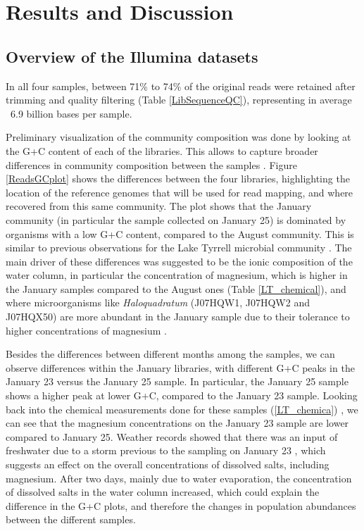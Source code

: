 \clearpage
\section{Results and Discussion}

\subsection{Overview of the Illumina datasets}

In all four samples, between 71\% to 74\% of the original reads were retained after trimming and quality filtering (Table \ref{LibSequenceQC}), representing in average ~6.9 billion bases per sample.

Preliminary visualization of the community composition was done by looking at the G+C content of each of the libraries. This allows to capture broader differences in community composition between the samples \cite{Podell:2013kx,Ghai:2012fb,Podell:2013fp}. Figure \ref{ReadsGCplot} shows the differences between the four libraries, highlighting the location of the reference genomes that will be used for read mapping, and where recovered from this same community. The plot shows that the January community (in particular the sample collected on January 25) is dominated by organisms with a low G+C content, compared to the August community. This is similar to previous observations for the Lake Tyrrell microbial community \cite{Podell:2013fp}. The main driver of these differences was suggested to be the ionic composition of the water column, in particular the concentration of magnesium, which is higher in the January samples compared to the August ones (Table \ref{LT_chemical}), and where microorganisms like \textit{Haloquadratum} (J07HQW1, J07HQW2 and J07HQX50) are more abundant in the January sample due to their tolerance to higher concentrations of magnesium \cite{Podell:2013fp}. 

Besides the differences between different months among the samples, we can observe differences within the January libraries, with different G+C peaks in the January 23 versus the January 25 sample. In particular, the January 25 sample shows a higher peak at lower G+C, compared to the January 23 sample. Looking back into the chemical measurements done for these samples (\ref{LT_chemica}) \cite{Podell:2013fp}, we can see that the magnesium concentrations on the January 23 sample are lower compared to January 25. Weather records showed that there was an input of freshwater due to a storm previous to the sampling on January 23 \cite{Podell:2013fp}, which suggests an effect on the overall concentrations of dissolved salts, including magnesium. After two days, mainly due to water evaporation, the concentration of dissolved salts in the water column increased, which could explain the difference in the G+C plots, and therefore the changes in population abundances between the different samples. 




